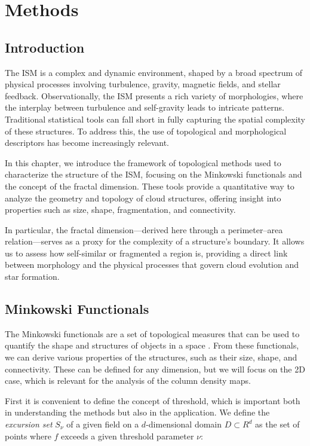 \chapter{Methods}
\label{ch:methods}

\section{Introduction}

The ISM is a complex and dynamic environment, shaped by a broad spectrum of physical processes involving turbulence, gravity, magnetic fields, and stellar feedback. Observationally, the ISM presents a rich variety of morphologies, where the interplay between turbulence and self-gravity leads to intricate patterns. Traditional statistical tools can fall short in fully capturing the spatial complexity of these structures. To address this, the use of topological and morphological descriptors has become increasingly relevant.

In this chapter, we introduce the framework of topological methods used to characterize the structure of the ISM, focusing on the Minkowski functionals and the concept of the fractal dimension. These tools provide a quantitative way to analyze the geometry and topology of cloud structures, offering insight into properties such as size, shape, fragmentation, and connectivity.

In particular, the fractal dimension—derived here through a perimeter–area relation—serves as a proxy for the complexity of a structure’s boundary. It allows us to assess how self-similar or fragmented a region is, providing a direct link between morphology and the physical processes that govern cloud evolution and star formation.

\section{Minkowski Functionals}

The Minkowski functionals are a set of topological measures that can be used to quantify the shape and structures of objects in a space \cite{mecke1993robust}. From these functionals, we can derive various properties of the structures, such as their size, shape, and connectivity.
These can be defined for any dimension, but we will focus on the 2D case, which is relevant for the analysis of the column density maps.

First it is convenient to define the concept of threshold, which is important both in understanding the methods but also in the application.
We define the \textit{excursion set} $S_{\nu}$ of a given field on a $d$-dimensional domain $D \subset R^d$ as the set of points where $f$ exceeds a given threshold parameter $\nu$:

